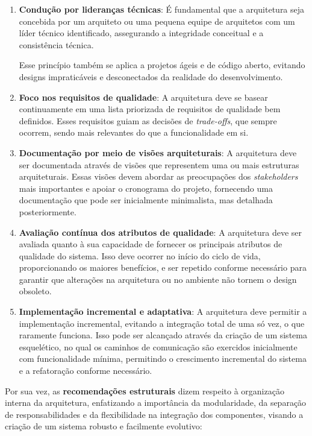 \begin{enumerate}
    \item \textbf{Condução por lideranças técnicas}: É fundamental que a arquitetura seja concebida por um arquiteto ou uma pequena equipe de arquitetos com um líder técnico identificado, assegurando a integridade conceitual e a consistência técnica. 
    
    Esse princípio também se aplica a projetos ágeis e de código aberto, evitando designs impraticáveis e desconectados da realidade do desenvolvimento.
    
    \item \textbf{Foco nos requisitos de qualidade}: A arquitetura deve se basear continuamente em uma lista priorizada de requisitos de qualidade bem definidos. Esses requisitos guiam as decisões de \textit{trade-offs}, que sempre ocorrem, sendo mais relevantes do que a funcionalidade em si.
    
    \item \textbf{Documentação por meio de visões arquiteturais}: A arquitetura deve ser documentada através de visões que representem uma ou mais estruturas arquiteturais. Essas visões devem abordar as preocupações dos \textit{stakeholders} mais importantes e apoiar o cronograma do projeto, fornecendo uma documentação que pode ser inicialmente minimalista, mas detalhada posteriormente.
    
    \item \textbf{Avaliação contínua dos atributos de qualidade}: A arquitetura deve ser avaliada quanto à sua capacidade de fornecer os principais atributos de qualidade do sistema. Isso deve ocorrer no início do ciclo de vida, proporcionando os maiores benefícios, e ser repetido conforme necessário para garantir que alterações na arquitetura ou no ambiente não tornem o design obsoleto.
    
    \item \textbf{Implementação incremental e adaptativa}: A arquitetura deve permitir a implementação incremental, evitando a integração total de uma só vez, o que raramente funciona. Isso pode ser alcançado através da criação de um sistema esquelético, no qual os caminhos de comunicação são exercidos inicialmente com funcionalidade mínima, permitindo o crescimento incremental do sistema e a refatoração conforme necessário.
\end{enumerate}

Por sua vez, as \textbf{recomendações estruturais} dizem respeito à organização interna da arquitetura, enfatizando a importância da modularidade, da separação de responsabilidades e da flexibilidade na integração dos componentes, visando a criação de um sistema robusto e facilmente evolutivo:

